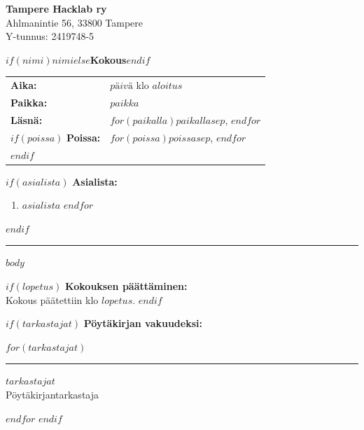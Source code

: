 \documentclass[11pt, a4paper]{article}
\begin{document}
\noindent
\textbf{Tampere Hacklab ry} \\
Ahlmanintie 56, 33800 Tampere \\
Y-tunnus: 2419748-5

\vspace{1cm}

\begin{center}
    {\LARGE \textbf{$if(nimi)$$nimi$$else$Kokous$endif$}}
\end{center}
\vspace{1cm}

\noindent
\begin{tabular}{@{}p{3cm} p{12cm}}
\textbf{Aika:} & $päivä$ klo $aloitus$ \\
\textbf{Paikka:} & $paikka$ \\
\textbf{Läsnä:} & $for(paikalla)$$paikalla$$sep$, $endfor$ \\
$if(poissa)$
\textbf{Poissa:} & $for(poissa)$$poissa$$sep$, $endfor$ \\
$endif$
\end{tabular}

\vspace{1cm}

$if(asialista)$
\noindent\textbf{Asialista:}
\begin{enumerate}
$for(asialista)$
  \item $asialista$
$endfor$
\end{enumerate}
\vspace{1cm}
$endif$

\hrule
\vspace{1cm}

$body$

$if(lopetus)$
\vspace{1.5cm}
\noindent \textbf{Kokouksen päättäminen:} \\
Kokous päätettiin klo $lopetus$.
$endif$

$if(tarkastajat)$
\vspace{1.5cm}
\noindent\textbf{Pöytäkirjan vakuudeksi:}

\vspace{0.5cm}
\noindent
$for(tarkastajat)$
\begin{minipage}[t]{7cm}
\vspace{1.5cm}
\hrule
\vspace{0.2cm}
$tarkastajat$\\
Pöytäkirjantarkastaja
\end{minipage}
\hspace{1cm}
$endfor$
$endif$
\end{document}
